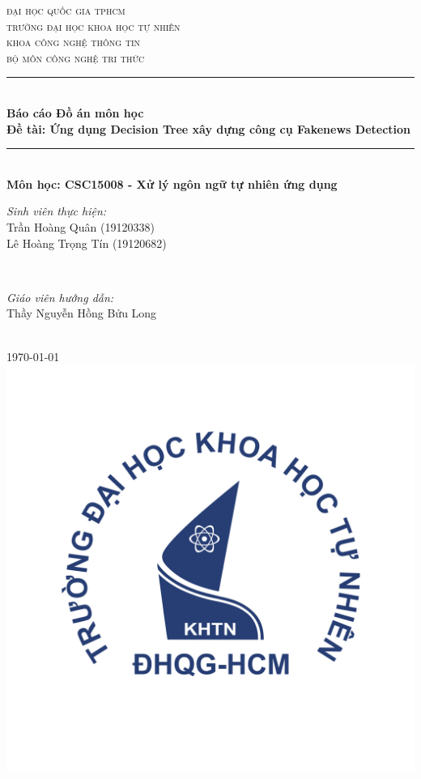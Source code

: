 \documentclass[12pt]{article}
\newcommand{\coursename}{CSC15008 - Xử lý ngôn ngữ tự nhiên ứng dụng}
\newcommand{\reportname}{Ứng dụng Decision Tree xây dựng công cụ Fakenews Detection}
\begin{document}
\begin{titlepage}
\newcommand{\HRule}{\rule{\linewidth}{0.5mm}}
\centering

\textsc{\LARGE đại học quốc gia tphcm}\\[1.5cm]
\textsc{\Large trường đại học khoa học tự nhiên}\\[0.5cm]
\textsc{\large khoa công nghệ thông tin}\\[0.5cm]
\textsc{bộ môn công nghệ tri thức}\\[0.5cm]

\HRule \\[0.4cm]
{ 
\huge{\bfseries{Báo cáo Đồ án môn học}}\\[0.5cm]
\large{\bfseries{Đề tài: \reportname}}
}\\[0.4cm]
\HRule \\[0.5cm]

\textbf{\large Môn học: \coursename}\\[0.5cm]

\begin{minipage}[t]{0.4\textwidth}
\begin{flushleft} \large
\emph{Sinh viên thực hiện:}\\
Trần Hoàng Quân (19120338)\\
Lê Hoàng Trọng Tín \textsc{(19120682)}
\end{flushleft}
\end{minipage}
~
\begin{minipage}[t]{0.4\textwidth}
\begin{flushright} \large
\emph{Giáo viên hướng dẫn:} \\
Thầy Nguyễn Hồng Bửu Long
\end{flushright}
\end{minipage}\\[2cm]

{\large \today}\\[2cm]

\includegraphics[scale=.25]{img/hcmus-logo.png}\\[1cm] 


\end{titlepage}
\end{document}
